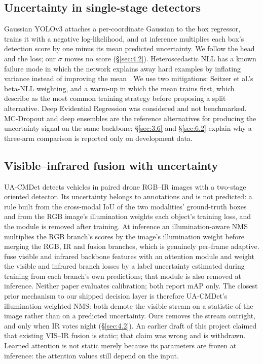 \documentclass[10pt]{article}
\begin{document}
\subsection{Uncertainty in single-stage detectors}\label{sec:2.1}
Gaussian YOLOv3 \citep{choi2019gaussian} attaches a per-coordinate Gaussian to the box regressor, trains it with a negative log-likelihood, and at inference multiplies each box's detection score by one minus its mean predicted uncertainty. We follow the head and the loss; our $\sigma$ moves no score (\S\ref{sec:4.2}). Heteroscedastic NLL has a known failure mode in which the network explains away hard examples by inflating variance instead of improving the mean \citep{seitzer2022on}. We use two mitigations: Seitzer et al.'s beta-NLL weighting, and a warm-up in which the mean trains first, which \citet{skafte2019reliable} describe as the most common training strategy before proposing a split alternative. Deep Evidential Regression \citep{amini2020deep} was considered and not benchmarked. MC-Dropout \citep{gal2016dropout} and deep ensembles \citep{lakshminarayanan2017simple} are the reference alternatives for producing the uncertainty signal on the same backbone; \S\ref{sec:3.6} and \S\ref{sec:6.2} explain why a three-arm comparison is reported only on development data.

\subsection{Visible--infrared fusion with uncertainty}\label{sec:2.2}
UA-CMDet \citep{sun2022dronebased} detects vehicles in paired drone RGB--IR images with a two-stage oriented detector. Its uncertainty belongs to annotations and is not predicted: a rule built from the cross-modal IoU of the two modalities' ground-truth boxes and from the RGB image's illumination weights each object's training loss, and the module is removed after training. At inference an illumination-aware NMS multiplies the RGB branch's scores by the image's illumination weight before merging the RGB, IR and fusion branches, which is genuinely per-frame adaptive. \citet{zhao2024uncertaintyaware} fuse visible and infrared backbone features with an attention module and weight the visible and infrared branch losses by a label uncertainty estimated during training from each branch's own predictions; that module is also removed at inference. Neither paper evaluates calibration; both report mAP only. The closest prior mechanism to our shipped decision layer is therefore UA-CMDet's illumination-weighted NMS: both demote the visible stream on a statistic of the image rather than on a predicted uncertainty. Ours removes the stream outright, and only when IR votes night (\S\ref{sec:4.2}). An earlier draft of this project claimed that existing VIS--IR fusion is static; that claim was wrong and is withdrawn. Learned attention is not static merely because its parameters are frozen at inference: the attention values still depend on the input.
\end{document}
